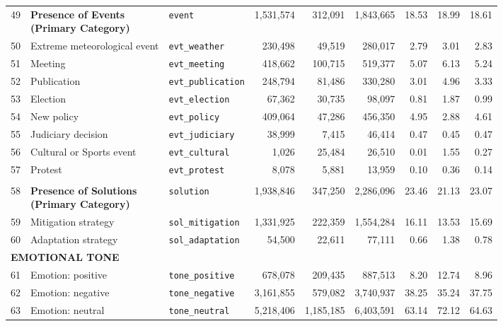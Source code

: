 \begin{longtable}{p{0.5cm}p{4.0cm}p{2.5cm}rrrrrr}
\midrule
\rowcolor{gray!8}
\multicolumn{9}{l}{\textit{Events}} \\
\midrule
49 & \textbf{Presence of Events\newline (Primary Category)} & \texttt{event} & 1,531,574 & 312,091 & 1,843,665 & 18.53 & 18.99 & 18.61 \\
\cmidrule(lr){1-9}
50 & Extreme meteorological event & \texttt{evt\_weather} & 230,498 & 49,519 & 280,017 & 2.79 & 3.01 & 2.83 \\
51 & Meeting & \texttt{evt\_meeting} & 418,662 & 100,715 & 519,377 & 5.07 & 6.13 & 5.24 \\
52 & Publication & \texttt{evt\_publication} & 248,794 & 81,486 & 330,280 & 3.01 & 4.96 & 3.33 \\
53 & Election & \texttt{evt\_election} & 67,362 & 30,735 & 98,097 & 0.81 & 1.87 & 0.99 \\
54 & New policy & \texttt{evt\_policy} & 409,064 & 47,286 & 456,350 & 4.95 & 2.88 & 4.61 \\
55 & Judiciary decision & \texttt{evt\_judiciary} & 38,999 & 7,415 & 46,414 & 0.47 & 0.45 & 0.47 \\
56 & Cultural or Sports event & \texttt{evt\_cultural} & 1,026 & 25,484 & 26,510 & 0.01 & 1.55 & 0.27 \\
57 & Protest & \texttt{evt\_protest} & 8,078 & 5,881 & 13,959 & 0.10 & 0.36 & 0.14 \\
\midrule
\rowcolor{gray!8}
\multicolumn{9}{l}{\textit{Solutions}} \\
\midrule
58 & \textbf{Presence of Solutions\newline (Primary Category)} & \texttt{solution} & 1,938,846 & 347,250 & 2,286,096 & 23.46 & 21.13 & 23.07 \\
\cmidrule(lr){1-9}
59 & Mitigation strategy & \texttt{sol\_mitigation} & 1,331,925 & 222,359 & 1,554,284 & 16.11 & 13.53 & 15.69 \\
60 & Adaptation strategy & \texttt{sol\_adaptation} & 54,500 & 22,611 & 77,111 & 0.66 & 1.38 & 0.78 \\
\midrule
\multicolumn{9}{l}{\cellcolor{gray!10}\textbf{EMOTIONAL TONE}} \\
\midrule
61 & Emotion: positive & \texttt{tone\_positive} & 678,078 & 209,435 & 887,513 & 8.20 & 12.74 & 8.96 \\
62 & Emotion: negative & \texttt{tone\_negative} & 3,161,855 & 579,082 & 3,740,937 & 38.25 & 35.24 & 37.75 \\
63 & Emotion: neutral & \texttt{tone\_neutral} & 5,218,406 & 1,185,185 & 6,403,591 & 63.14 & 72.12 & 64.63 \\

\end{longtable}
